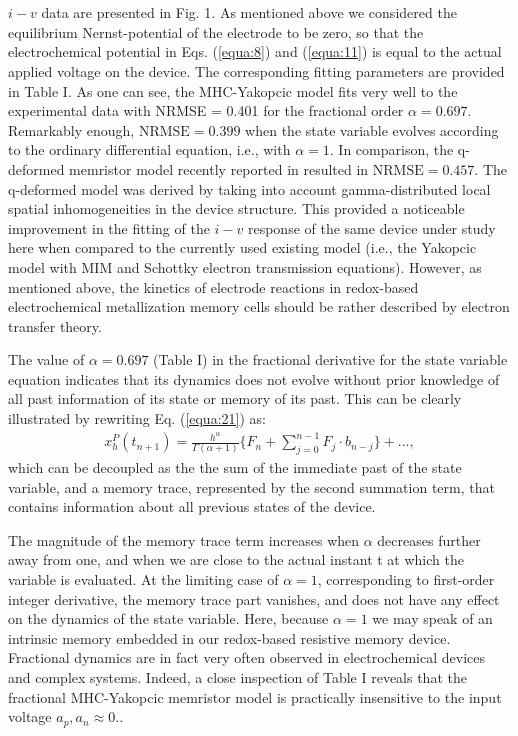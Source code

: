 \documentclass[10pt]{article}
\begin{document}
\begin{multicols}{2}
        \\
        \\
        $i-v$ data are presented in Fig. 1. As mentioned above we considered the equilibrium Nernst-potential of the electrode to be zero, so that the electrochemical potential in Eqs. (\ref{equa:8}) and (\ref{equa:11}) is equal to the actual applied voltage on the device. The corresponding fitting parameters are provided in Table I. As one can see, the MHC-Yakopcic model fits very well to the experimental data with NRMSE = 0.401 for the fractional order $\alpha = 0.697$. Remarkably enough, $\text{NRMSE} = 0.399$ when the state variable evolves according to the ordinary differential equation, i.e., with $\alpha = 1$. In comparison, the q-deformed memristor model recently reported in resulted in $\text{NRMSE} = 0.457$. The q-deformed model was derived by taking into account gamma-distributed local spatial inhomogeneities in the device structure. This provided a noticeable improvement in the fitting of the $i-v$ response of the same device under study here when compared to the currently used existing model (i.e., the Yakopcic model with MIM and Schottky electron transmission equations). However, as mentioned above, the kinetics of electrode reactions in redox-based electrochemical metallization memory cells should be rather described by electron transfer theory. \par
        The value of $\alpha = 0.697$ (Table I) in the fractional derivative for the state variable equation indicates that its dynamics does not evolve without prior knowledge of all past information of its state or memory of its past. This can be clearly illustrated by rewriting Eq. (\ref{equa:21}) as:
        \begin{align}
            x_h^P (t_{n+1}) = \frac{h^\alpha}{\Gamma (\alpha + 1)} \biggl\{ F_n + \sum_{j=0}^{n-1} F_j \cdot b_{n-j} \biggr\} + ..., \label{equa:28}
        \end{align}
        which can be decoupled as the the sum of the immediate past of the state variable, and a memory trace, represented by the second summation term, that contains information about all previous states of the device. \par
        The magnitude of the memory trace term increases when $\alpha$ decreases further away from one, and when we are close to the actual instant t at which the variable is evaluated. At the limiting case of $\alpha = 1$, corresponding to first-order integer derivative, the memory trace part vanishes, and does not have any effect on the dynamics of the state variable. Here, because $\alpha = 1$ we may speak of an intrinsic memory embedded in our redox-based resistive memory device. Fractional dynamics are in fact very often observed in electrochemical devices and complex systems. Indeed, a close inspection of Table I reveals that the fractional MHC-Yakopcic memristor model is practically insensitive to the input voltage $a_p, a_n \approx 0.$.
        \\
        \par
        {\centering %
}
\end{multicols}
\end{document}
